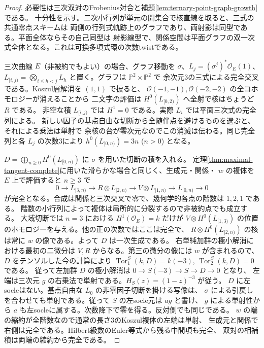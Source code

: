 \begin{proof}
必要性は三次双対のFrobenius対合と補題\ref{lem:ternary-point-graph-growth}である。
十分性を示す。二次小行列が単元の開集合で核直線を取ると、三式の共通零点スキームは
両側の行列式軌跡上のグラフであり、両射影は同型である。平面全体ならその自己同型は
射影線型で、関係空間は平面グラフの双一次式全体となる。これは可換多項式環の次数twistである。

三次曲線 $E$（非被約でもよい）の場合、グラフ移動を $\sigma$、$L_j=(\sigma^j)^*\mathcal O_E(1)$、
$L_{[i,j)}=\bigotimes_{i\le h<j}L_h$ と置く。グラフは $\mathbb P^2\times\mathbb P^2$ で
余次元3の三式による完全交叉である。Koszul層解消を $(1,1)$ で捩ると、
$\mathcal O(-1,-1),\mathcal O(-2,-2)$ の全コホモロジーが消えることから
二文字の評価は $H^0(L_{[0,2)})$ へ全射で核はちょうど $R$ である。
非空な積 $L_{[i,j)}$ では $H^1=0$ である。実際 $L_i$ では平面三次式の完全列による。
新しい因子の基点自由な切断から全随伴点を避けるものを選ぶと、それによる乗法は単射で
余核の台が零次元なのでこの消滅は伝わる。同じ完全列と各 $L_j$ の次数3により
$h^0(L_{[0,n)})=3n$ ($n>0$) となる。

$D=\bigoplus_{n\ge0}H^0(L_{[0,n)})$ に $\sigma$ を用いた切断の積を入れる。
定理\ref{thm:maximal-tangent-complete}に用いた滑らかな場合と同じく、生成元・関係・
$w$ の複体を $E$ 上で評価すると $n\ge3$ で
\[
 0\to L_{[3,n)}\to R\otimes L_{[2,n)}
 \to V\otimes L_{[1,n)}\to L_{[0,n)}\to0
\]
が完全となる。合成は関係と三次交叉で零で、幾何学的各点の階数は $1,2,1$ である。
階数の小行列によって複体は局所的に分裂するので非被約点でも成立する。
大域切断では $n=3$ における $H^1(\mathcal O_E)=k$ だけが
$V\otimes H^0(L_{[1,3)})$ の位置のホモロジーを与える。他の正の次数ではここは完全で、
$R\otimes H^0(L_{[2,n)})$ の核は常に $w$ の像である。よって $D$ は一次生成である。
右単純加群の極小解消における最初の二微分は $V,R$ からなる。第三の微分の像には
$w$ が含まれるので、$D$ をテンソルした今の計算により
$\operatorname{Tor}_1^S(k,D)=k(-3)$, $\operatorname{Tor}_2^S(k,D)=0$ である。
従って左加群 $D$ の極小解消は $0\to S(-3)\to S\to D\to0$ となり、
左端は三次元 $g$ の右乗法で単射である。$H_S(z)=(1-z)^{-3}$ が従う。
$D$ に左socleはない。基点自由な $L_0$ の非零因子切断を掛ける写像は、
$\sigma$ による引戻しを合わせても単射である。従って $S$ の左socle元は $a g$ と書け、
$g$ による単射性から $a$ も左socleに属する。次数降下で零を得る。反対側でも同じである。
$w$ の端の縮約が全階数なので通常の長さ3のKoszul複体の左端は単射、
生成元と関係で右側は完全である。Hilbert級数のEuler等式から残る中間項も完全、
双対の相補積は両端の縮約から完全である。
\end{proof}

